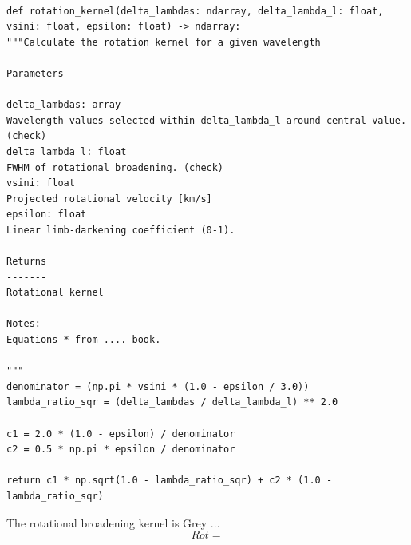\begin{lstlisting}

def rotation_kernel(delta_lambdas: ndarray, delta_lambda_l: float, vsini: float, epsilon: float) -> ndarray:
"""Calculate the rotation kernel for a given wavelength

Parameters
----------
delta_lambdas: array
Wavelength values selected within delta_lambda_l around central value. (check)
delta_lambda_l: float
FWHM of rotational broadening. (check)
vsini: float
Projected rotational velocity [km/s]
epsilon: float
Linear limb-darkening coefficient (0-1).

Returns
-------
Rotational kernel

Notes:
Equations * from .... book.

"""
denominator = (np.pi * vsini * (1.0 - epsilon / 3.0))
lambda_ratio_sqr = (delta_lambdas / delta_lambda_l) ** 2.0

c1 = 2.0 * (1.0 - epsilon) / denominator
c2 = 0.5 * np.pi * epsilon / denominator

return c1 * np.sqrt(1.0 - lambda_ratio_sqr) + c2 * (1.0 - lambda_ratio_sqr)
\end{lstlisting}

The rotational broadening kernel is {Grey ...}
\begin{equation}
Rot = 
\end{equation}